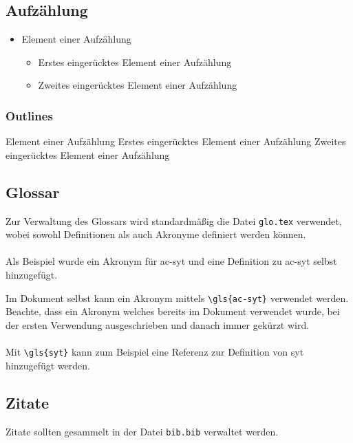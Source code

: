 \newpage
\subsection{Aufzählung}
\begin{itemize}
	\item Element einer Aufzählung
	\begin{itemize}
        \item Erstes eingerücktes Element einer Aufzählung
        \item Zweites eingerücktes Element einer Aufzählung
    \end{itemize}
\end{itemize}

\subsubsection{Outlines}
\begin{outline}
    \1 Element einer Aufzählung
        \2 Erstes eingerücktes Element einer Aufzählung
        \2 Zweites eingerücktes Element einer Aufzählung
\end{outline}

\subsection{Glossar}
Zur Verwaltung des Glossars wird standardmäßig die Datei \texttt{glo.tex} verwendet, wobei sowohl Definitionen als auch Akronyme definiert werden können.
\\\\
Als Beispiel wurde ein Akronym für \gls{ac-syt} und eine Definition zu \gls{ac-syt} selbst hinzugefügt.


Im Dokument selbst kann ein Akronym mittels \verb|\gls{ac-syt}| verwendet werden. Beachte, dass ein Akronym welches bereits im Dokument verwendet wurde, bei der ersten Verwendung ausgeschrieben und danach immer gekürzt wird.
\\\\
Mit \verb|\gls{syt}| kann zum Beispiel eine Referenz zur Definition von \gls{syt} hinzugefügt werden.

\subsection{Zitate}
Zitate sollten gesammelt in der Datei \texttt{bib.bib} verwaltet werden.

\newpage
